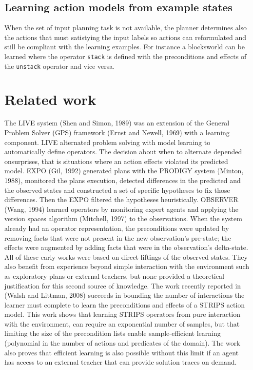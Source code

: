 \documentclass[letterpaper]{article} %
\begin{document}
\subsection{Learning action models from example states}
When the set of input planning task is not available, the planner determines also the actions that must satistying the input labels so actions can reformulated and still be compliant with the learning examples. For instance a blocksworld can be learned where the operator {\small\tt stack} is defined with the preconditions and effects of the {\small\tt unstack} operator and vice versa. 








\section{Related work}

The  LIVE  system  (Shen  and  Simon,  1989)  was  an  extension  of  the  General  Problem  Solver  (GPS) framework (Ernst and Newell, 1969) with a learning component. LIVE alternated problem solving with model  learning  to  automatically  define  operators.  The  decision  about  when  to  alternate  depended  onsurprises,  that  is  situations  where  an  action  effects  violated  its  predicted  model.  EXPO  (Gil,  1992) generated plans with the  PRODIGY  system (Minton, 1988), monitored the plans execution, detected differences in the predicted and the observed states and constructed a set of specific hypotheses to fix those differences. Then the  EXPO  filtered the hypotheses heuristically.  OBSERVER  (Wang, 1994) learned operators by monitoring expert agents and applying the version spaces algorithm (Mitchell, 1997) to the observations. When the system already had an operator representation, the preconditions were updated by removing facts that were not present in the new observation’s pre-state; the effects were augmented by adding facts that were in the observation’s delta-state. All of these early works were based on direct liftings of the observed states. They also benefit from experience beyond simple interaction with the environment such as exploratory plans or external teachers, but  none  provided  a  theoretical  justification  for  this  second  source  of  knowledge.  The  work  recently reported in (Walsh and Littman, 2008) succeeds in bounding the number of interactions the learner must complete to learn the preconditions and effects of a STRIPS action model. This work shows that learning STRIPS  operators  from  pure  interaction  with  the  environment,  can  require  an  exponential  number  of samples, but that limiting the size of the precondition lists enable sample-efficient learning (polynomial in the number of actions and predicates of the domain). The work also proves that efficient learning is also possible without this limit if an agent has access to an external teacher that can provide solution traces on demand.
\end{document}
